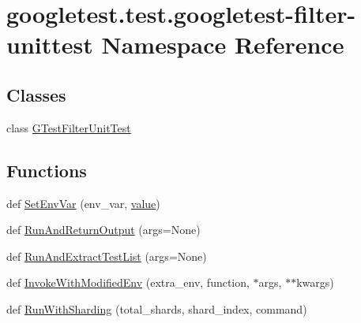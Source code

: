 \hypertarget{namespacegoogletest_1_1test_1_1googletest-filter-unittest}{}\section{googletest.\+test.\+googletest-\/filter-\/unittest Namespace Reference}
\label{namespacegoogletest_1_1test_1_1googletest-filter-unittest}
\subsection*{Classes}
\begin{DoxyCompactItemize}
\item 
class \mbox{\hyperlink{classgoogletest_1_1test_1_1googletest-filter-unittest_1_1_g_test_filter_unit_test}{G\+Test\+Filter\+Unit\+Test}}
\end{DoxyCompactItemize}
\subsection*{Functions}
\begin{DoxyCompactItemize}
\item 
def \mbox{\hyperlink{namespacegoogletest_1_1test_1_1googletest-filter-unittest_ab1f9b08e84805d31be99e2062bf33d12}{Set\+Env\+Var}} (env\+\_\+var, \mbox{\hyperlink{_obj__test_2lib_2googletest-master_2googlemock_2test_2gmock-matchers__test_8cc_a337b8a670efc0b086ad3af163f3121b6}{value}})
\item 
def \mbox{\hyperlink{namespacegoogletest_1_1test_1_1googletest-filter-unittest_a9148123b84571c3f71e9bc696b4a5602}{Run\+And\+Return\+Output}} (args=None)
\item 
def \mbox{\hyperlink{namespacegoogletest_1_1test_1_1googletest-filter-unittest_a2713cde4887dae3fbf7dea6609be9c3c}{Run\+And\+Extract\+Test\+List}} (args=None)
\item 
def \mbox{\hyperlink{namespacegoogletest_1_1test_1_1googletest-filter-unittest_af029a8050c10c4ec9391cfca6c64c6c3}{Invoke\+With\+Modified\+Env}} (extra\+\_\+env, function, $\ast$args, $\ast$$\ast$kwargs)
\item 
def \mbox{\hyperlink{namespacegoogletest_1_1test_1_1googletest-filter-unittest_a8a2811c773df0897f343b9a3f3af4619}{Run\+With\+Sharding}} (total\+\_\+shards, shard\+\_\+index, command)
\end{DoxyCompactItemize}
